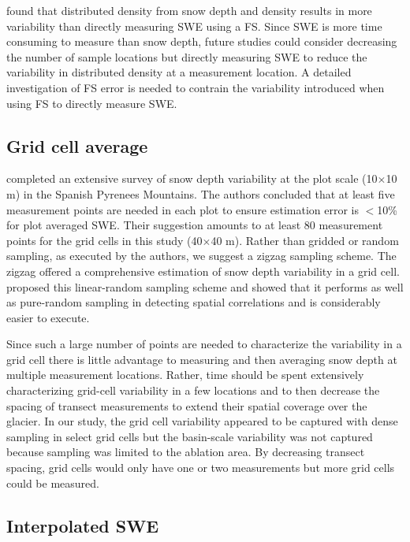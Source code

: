 \documentclass[twocolumn,letterpaper]{igs}
\begin{document}
\cite{Wetlaufer2016} found that distributed density from snow depth and density results in more variability than directly measuring SWE using a FS. Since SWE is more time consuming to measure than snow depth, future studies could consider decreasing the number of sample locations but directly measuring SWE to reduce the variability in distributed density at a measurement location. A detailed investigation of FS error is needed to contrain the variability introduced when using FS to directly measure SWE.

\subsection{Grid cell average}

\cite{Lopez2011} completed an extensive survey of snow depth variability at the plot scale (10$\times$10 m) in the Spanish Pyrenees Mountains. The authors concluded that at least five measurement points are needed in each plot to ensure estimation error is $<$10\% for plot averaged SWE. Their suggestion amounts to at least 80 measurement points for the grid cells in this study (40$\times$40 m). Rather than gridded or random sampling, as executed by the authors, we suggest a zigzag sampling scheme. The zigzag offered a comprehensive estimation of snow depth variability in a grid cell. \cite{Shea2010} proposed this linear-random sampling scheme and showed that it performs as well as pure-random sampling in detecting spatial correlations and is considerably easier to execute. 

Since such a large number of points are needed to characterize the variability in a grid cell there is little advantage to measuring and then averaging snow depth at multiple measurement locations. Rather, time should be spent extensively characterizing grid-cell variability in a few locations and to then decrease the spacing of transect measurements to extend their spatial coverage over the glacier. In our study, the grid cell variability appeared to be captured with dense sampling in select grid cells but the basin-scale variability was not captured because sampling was limited to the ablation area. By decreasing transect spacing, grid cells would only have one or two measurements but more grid cells could be measured. 

\subsection{Interpolated SWE}
\end{document}
